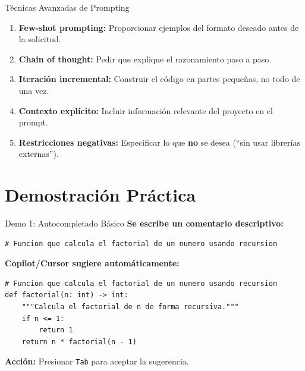 \documentclass[aspectratio=169]{beamer}
\begin{document}
\begin{frame}{Técnicas Avanzadas de Prompting}
    \begin{enumerate}
        \setlength\itemsep{0.8em}
        \item \textbf{Few-shot prompting:} Proporcionar ejemplos del formato deseado antes de la solicitud.
        
        \item \textbf{Chain of thought:} Pedir que explique el razonamiento paso a paso.
        
        \item \textbf{Iteración incremental:} Construir el código en partes pequeñas, no todo de una vez.
        
        \item \textbf{Contexto explícito:} Incluir información relevante del proyecto en el prompt.
        
        \item \textbf{Restricciones negativas:} Especificar lo que \textbf{no} se desea (``sin usar librerías externas'').
    \end{enumerate}
\end{frame}

\section{Demostración Práctica}

\begin{frame}[fragile]{Demo 1: Autocompletado Básico}
    \textbf{Se escribe un comentario descriptivo:}
    \begin{lstlisting}
# Funcion que calcula el factorial de un numero usando recursion
    \end{lstlisting}
    
    \vspace{0.3cm}
    \textbf{Copilot/Cursor sugiere automáticamente:}
    \begin{lstlisting}
# Funcion que calcula el factorial de un numero usando recursion
def factorial(n: int) -> int:
    """Calcula el factorial de n de forma recursiva."""
    if n <= 1:
        return 1
    return n * factorial(n - 1)
    \end{lstlisting}
    
    \vspace{0.3cm}
    \textbf{Acción:} Presionar \texttt{Tab} para aceptar la sugerencia.
\end{frame}
\end{document}
